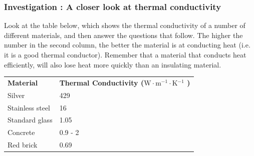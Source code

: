             \subsubsection{  Investigation : A closer look at thermal conductivity
      }
            \nopagebreak
      \label{m38706*id66744}Look at the table below, which shows the thermal conductivity of a number of different materials, and then answer the questions that follow. The higher the number in the second column, the better the material is at conducting heat (i.e. it is a good thermal conductor). Remember that a material that conducts heat efficiently, will also lose heat more quickly than an insulating material.\par 
          \begin{table}[H]
        \begin{center}
      \label{m38706*id66753}
    \noindent
      \tablelasttail{}
      \begin{xtabular}[t]{|l|l|}\hline
                \textbf{Material}
               &
                \textbf{Thermal Conductivity ($\mathrm{W}\ensuremath{\cdot}\mathrm{m}{}^{-1}\ensuremath{\cdot}\mathrm{K}{}^{-1}$
) }
     \tabularnewline{}
        Silver &
        429%
     \tabularnewline{}
        Stainless steel &
        16%
     \tabularnewline{}
        Standard glass &
        1.05%
     \tabularnewline{}
        Concrete &
        0.9 - 2%
     \tabularnewline{}
        Red brick &
        0.69%
     \tabularnewline{}

\end{xtabular}
\end{center}
\end{table}
